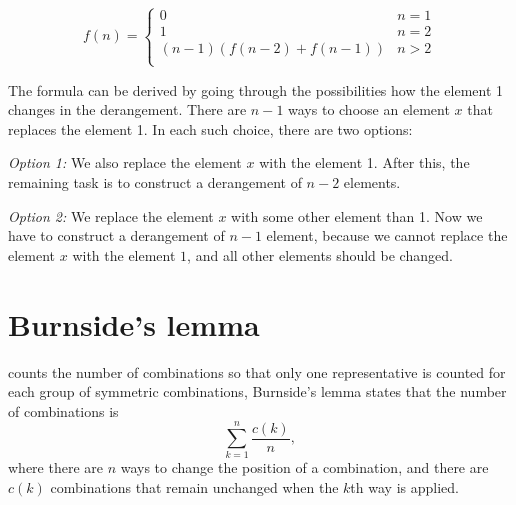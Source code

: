 \begin{equation*}
    f(n) = \begin{cases}
               0               & n = 1\\
               1               & n = 2\\
               (n-1)(f(n-2) + f(n-1)) & n>2 \\
           \end{cases}
\end{equation*}

The formula can be derived by going through
the possibilities how the element 1 changes
in the derangement.
There are $n-1$ ways to choose an element $x$
that replaces the element 1.
In each such choice, there are two options:

\textit{Option 1:} We also replace the element $x$
with the element 1.
After this, the remaining task is to construct
a derangement of $n-2$ elements.

\textit{Option 2:} We replace the element $x$
with some other element than 1.
Now we have to construct a derangement
of $n-1$ element, because we cannot replace
the element $x$ with the element $1$, and all other
elements should be changed.

\section{Burnside's lemma}


 counts the number of
combinations so that
only one representative is counted
for each group of symmetric combinations,
Burnside's lemma states that the number of
combinations is
\[\sum_{k=1}^n \frac{c(k)}{n},\]
where there are $n$ ways to change the
position of a combination,
and there are $c(k)$ combinations that
remain unchanged when the $k$th way is applied.

